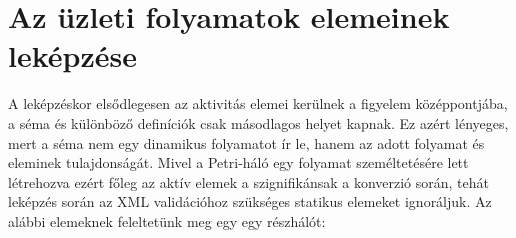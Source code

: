\documentclass[12pt,a4paper]{book}
\begin{document}
\chapter{Az üzleti folyamatok elemeinek leképzése}

A leképzéskor elsődlegesen az aktivitás elemei kerülnek a figyelem középpontjába, a séma és különböző definíciók csak másodlagos helyet kapnak. Ez azért lényeges, mert a séma nem egy dinamikus folyamatot ír le, hanem az adott folyamat és eleminek tulajdonságát. Mivel a Petri-háló egy folyamat személtetésére lett létrehozva ezért főleg az aktív elemek a szignifikánsak a konverzió során, tehát leképzés során az XML validációhoz szükséges statikus elemeket ignoráljuk.  Az alábbi elemeknek feleltetünk meg egy egy részhálót:
\end{document}
